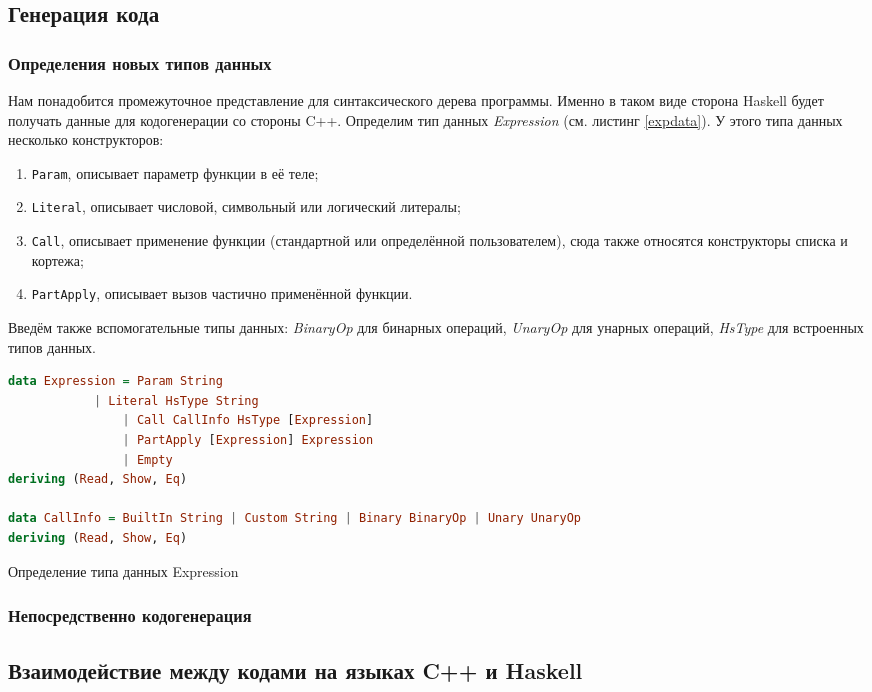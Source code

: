 	\subsection{Генерация кода}
		\subsubsection{Определения новых типов данных}
		Нам понадобится промежуточное представление для синтаксического дерева программы. Именно в таком виде сторона Haskell будет получать данные для кодогенерации со стороны C++. Определим тип данных \textit{Expression} (см. листинг \ref{expdata}). У этого типа данных несколько конструкторов:
		\begin{enumerate}[1)]
			\item \lstinline!Param!, описывает параметр функции в её теле;
			\item \lstinline!Literal!, описывает числовой, символьный или логический литералы;
			\item \lstinline!Call!, описывает применение функции (стандартной или определённой пользователем), сюда также относятся конструкторы списка и кортежа;
			\item \lstinline!PartApply!, описывает вызов частично применённой функции.			
		\end{enumerate}
		
		Введём также вспомогательные типы данных: \textit{BinaryOp} для бинарных операций, \textit{UnaryOp} для унарных операций, \textit{HsType} для встроенных типов данных.
		
		\begin{ListingEnv}[h]
		\begin{lstlisting}[language=Haskell]
data Expression = Param String
	        | Literal HsType String
                | Call CallInfo HsType [Expression]
                | PartApply [Expression] Expression
                | Empty
deriving (Read, Show, Eq)	
	
data CallInfo = BuiltIn String | Custom String | Binary BinaryOp | Unary UnaryOp
deriving (Read, Show, Eq)
		\end{lstlisting}
		\caption{Определение типа данных Expression}\label{expdata}
		\end{ListingEnv}
		
		\subsubsection{Непосредственно кодогенерация}
	\subsection{Взаимодействие между кодами на языках C++ и Haskell}
